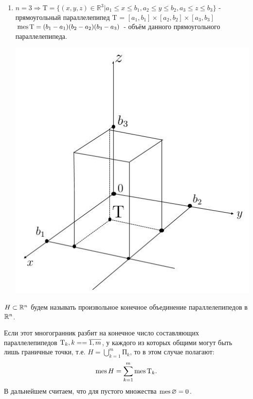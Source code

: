 \begin{enumerate}
\begin{center}
	\end{center}
  \item $n = 3 \Rightarrow \text{T} = \{ (x,y,z) \in \mathbb{R}^3 | a_1 \leqslant x \leqslant b_1, a_2 \leqslant y \leqslant b_2, a_3 \leqslant z \leqslant b_3  \}$ - прямоугольный параллелепипед T = $[a_1,b_1] \times [a_2,b_2] \times [a_3,b_3]$ \\
	$\operatorname{mes} \text{T} = (b_1-a_1)(b_2-a_2)(b_3-a_3)$ - объём данного прямоугольного параллелепипеда.
	\begin{center}
		\includegraphics[scale=0.6]{img/634.jpg}
	\end{center}
\end{enumerate}

 $H \subset \mathbb{R}^n$ будем называть произвольное конечное объединение параллелепипедов в $\mathbb{R}^n$.

Если этот многогранник разбит на конечное число  составляющих параллелепипедов $\text{T}_k, k = \linebreak = \overline{1,m}$, у каждого из которых общими могут быть лишь граничные точки, т.е. $H = \bigcup\limits_{k=1}^m \text{П}_k$, то в этом случае полагают:
\begin{equation}
	\label{612}
	\operatorname{mes} H = \sum\limits_{k=1}^{m} \operatorname{mes} \text{T}_k.
\end{equation}
В дальнейшем считаем, что для пустого множества $\operatorname{mes} \varnothing = 0$.

